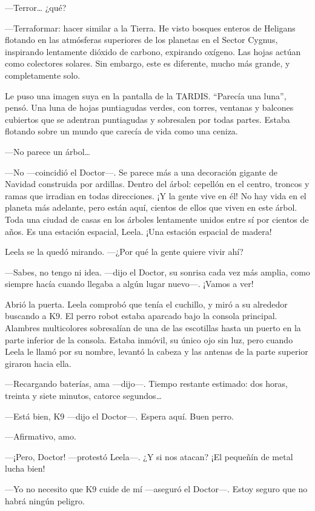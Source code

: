 ---Terror\ldots{} ¿qué?

---Terraformar: hacer similar a la Tierra. He visto bosques enteros de
Heligans flotando en las atmósferas superiores de los planetas en el
Sector Cygnus, inspirando lentamente dióxido de carbono, expirando
oxígeno. Las hojas actúan como colectores solares. Sin embargo, este es
diferente, mucho más grande, y completamente solo.

Le puso una imagen suya en la pantalla de la TARDIS. ``Parecía una
luna'', pensó. Una luna de hojas puntiagudas verdes, con torres,
ventanas y balcones cubiertos que se adentran puntiagudas y sobresalen
por todas partes. Estaba flotando sobre un mundo que carecía de vida
como una ceniza.

---No parece un árbol\ldots{}

---No ---coincidió el Doctor---. Se parece más a una decoración gigante
de Navidad construida por ardillas. Dentro del árbol: cepellón en el
centro, troncos y ramas que irradian en todas direcciones. ¡Y la gente
vive en él! No hay vida en el planeta más adelante, pero están aquí,
cientos de ellos que viven en este árbol. Toda una ciudad de casas en
los árboles lentamente unidos entre sí por cientos de años. Es una
estación espacial, Leela. ¡Una estación espacial de madera!

Leela se la quedó mirando. ---¿Por qué la gente quiere vivir ahí?

---Sabes, no tengo ni idea. ---dijo el Doctor, su sonrisa cada vez más
amplia, como siempre hacía cuando llegaba a algún lugar nuevo---. ¡Vamos
a ver!

Abrió la puerta. Leela comprobó que tenía el cuchillo, y miró a su
alrededor buscando a K9. El perro robot estaba aparcado bajo la consola
principal. Alambres multicolores sobresalían de una de las escotillas
hasta un puerto en la parte inferior de la consola. Estaba inmóvil, su
único ojo sin luz, pero cuando Leela le llamó por su nombre, levantó la
cabeza y las antenas de la parte superior giraron hacia ella.

---Recargando baterías, ama ---dijo---. Tiempo restante estimado: dos
horas, treinta y siete minutos, catorce segundos\ldots{}

---Está bien, K9 ---dijo el Doctor---. Espera aquí. Buen perro.

---Afirmativo, amo.

---¡Pero, Doctor! ---protestó Leela---. ¿Y si nos atacan? ¡El pequeñín
de metal lucha bien!

---Yo no necesito que K9 cuide de mí ---aseguró el Doctor---. Estoy
seguro que no habrá ningún peligro.

